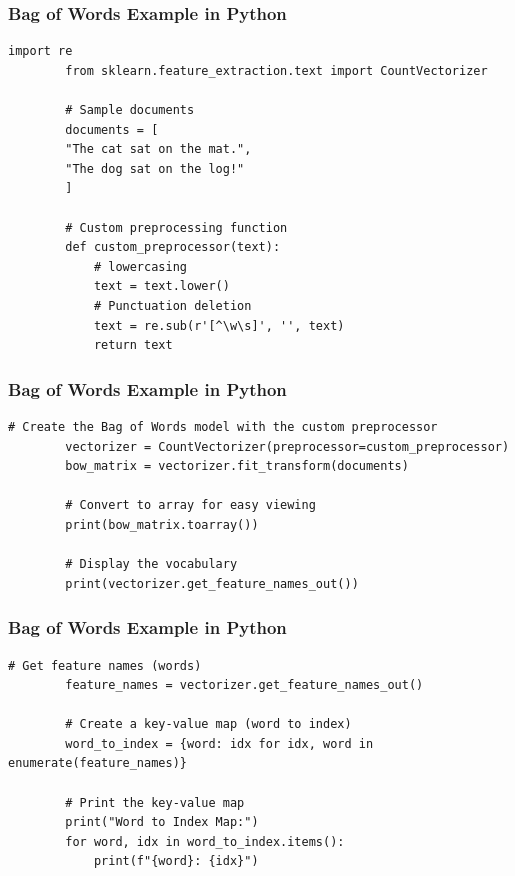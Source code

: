 \documentclass{beamer}
\begin{document}
\begin{frame}[fragile]
    \frametitle{Bag of Words Example in Python}
    \begin{lstlisting}[style=pythonStyle, caption=Bag of Words with CountVectorizer 01]
        import re
        from sklearn.feature_extraction.text import CountVectorizer

        # Sample documents
        documents = [
        "The cat sat on the mat.",
        "The dog sat on the log!"
        ]

        # Custom preprocessing function
        def custom_preprocessor(text):
            # lowercasing
            text = text.lower()
            # Punctuation deletion
            text = re.sub(r'[^\w\s]', '', text)
            return text
    \end{lstlisting}
\end{frame}

\begin{frame}[fragile]
    \frametitle{Bag of Words Example in Python}
    \begin{lstlisting}[style=pythonStyle, caption=Bag of Words with CountVectorizer 02]
        # Create the Bag of Words model with the custom preprocessor
        vectorizer = CountVectorizer(preprocessor=custom_preprocessor)
        bow_matrix = vectorizer.fit_transform(documents)

        # Convert to array for easy viewing
        print(bow_matrix.toarray())

        # Display the vocabulary
        print(vectorizer.get_feature_names_out())
    \end{lstlisting}
\end{frame}

\begin{frame}[fragile]
    \frametitle{Bag of Words Example in Python}
    \begin{lstlisting}[style=pythonStyle, caption=Bag of Words with CountVectorizer 03]
        # Get feature names (words)
        feature_names = vectorizer.get_feature_names_out()

        # Create a key-value map (word to index)
        word_to_index = {word: idx for idx, word in enumerate(feature_names)}

        # Print the key-value map
        print("Word to Index Map:")
        for word, idx in word_to_index.items():
            print(f"{word}: {idx}")
    \end{lstlisting}
\end{frame}
\end{document}

